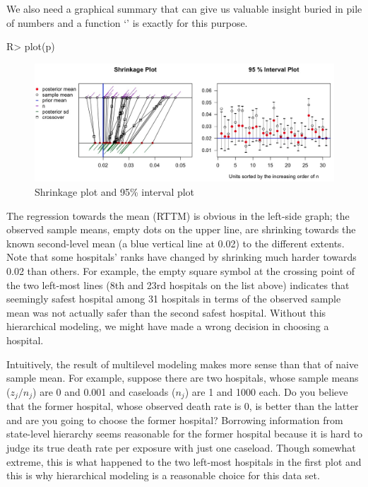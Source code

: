 \documentclass[article]{jss}
\begin{document}
We also need a graphical summary that can give us valuable insight buried in pile of numbers and a function `' is exactly for this purpose.
\begin{CodeChunk}
\begin{CodeInput}
R> plot(p)
\end{CodeInput}
\end{CodeChunk}
\begin{figure}[h]
\begin{center}
\includegraphics[scale=0.25]{hospital1.png}
\caption{Shrinkage plot and 95\% interval plot}
\end{center}
\end{figure}

The regression towards the mean (RTTM) is obvious in the left-side graph; the observed sample means, empty dots on the upper line, are shrinking towards the known second-level mean (a blue vertical line at 0.02) to the different extents. Note that some hospitals' ranks have changed by shrinking much harder towards 0.02 than others. For example, the empty square symbol at the crossing point of the two left-most lines (8th and 23rd hospitals on the list above) indicates that seemingly safest hospital among 31 hospitals in terms of the observed sample mean was not actually safer than the second safest hospital. Without this hierarchical modeling, we might have made a wrong decision in choosing a hospital.


Intuitively, the result of multilevel modeling makes more sense than that of naive sample mean. For example, suppose there are two hospitals, whose sample means ($z_{j} / n_{j}$) are 0 and 0.001 and caseloads ($n_{j}$) are 1 and 1000 each. Do you believe that the former hospital, whose observed death rate is 0, is better than the latter and are you going to choose the former hospital? Borrowing information from state-level hierarchy seems reasonable for the former hospital because it is hard to judge its true death rate per exposure with just one caseload. Though somewhat extreme, this is what happened to the two left-most hospitals in the first plot and this is why hierarchical modeling is a reasonable choice for this data set.
\end{document}
